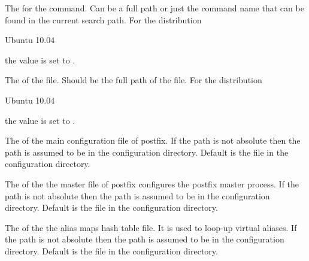 The  for the  command. Can be a full path or
just the command name that can be found in the current search path.
For the distribution
\begin{inparaitem}
\item[\TheDistribution{ubuntu}] Ubuntu 10.04
\end{inparaitem}
the value is set to .


The  of the  file. Should be the full path 
of the file.
For the distribution
\begin{inparaitem}
\item[\TheDistribution{ubuntu}] Ubuntu 10.04
\end{inparaitem}
the value is set to .


The  of the main configuration file of postfix.
If the path is not absolute then the path is assumed to be
in the configuration directory.
Default is the file  in the configuration directory.


The  of the the master file of postfix configures
the postfix master process. 
If the path is not absolute then the path is assumed to be
in the configuration directory.
Default is the file  in the configuration directory.


The  of the the alias maps hash table file. It is used to loop-up
virtual aliases. If the path is not absolute then the path is assumed to be
in the configuration directory. 
Default is the file  in the configuration directory.


